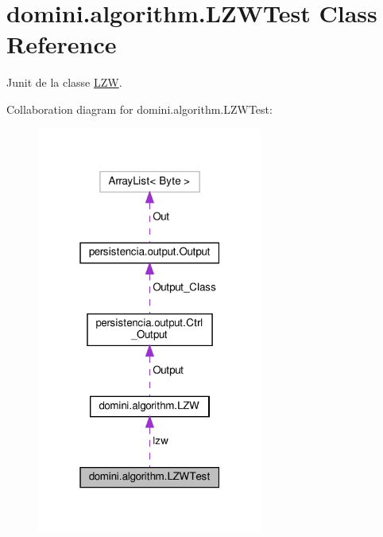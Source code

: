 \hypertarget{classdomini_1_1algorithm_1_1LZWTest}{}\section{domini.\+algorithm.\+L\+Z\+W\+Test Class Reference}
\label{classdomini_1_1algorithm_1_1LZWTest}


Junit de la classe \hyperlink{classdomini_1_1algorithm_1_1LZW}{L\+ZW}.  




Collaboration diagram for domini.\+algorithm.\+L\+Z\+W\+Test\+:\nopagebreak
\begin{figure}[H]
\begin{center}
\leavevmode
\includegraphics[width=211pt]{classdomini_1_1algorithm_1_1LZWTest__coll__graph}
\end{center}
\end{figure}
